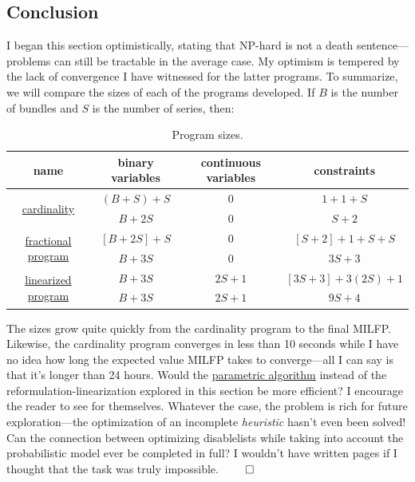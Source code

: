 \documentclass[11pt, oneside]{article}
\theoremstyle{plain}
\theoremstyle{definition}
\begin{document}
\subsection{Conclusion}
I began this section optimistically, stating that NP-hard is not a death
sentence---problems can still be tractable in the average case. My optimism is
tempered by the lack of convergence I have witnessed for the latter programs.
To summarize, we will compare the sizes of each of the programs developed. If
\( B \) is the number of bundles and \( S \) is the number of series, then:
\begin{table}[h!]
  \centering
  \begin{tabular}{|c|c|c|c|}
    \hline
    name & binary variables & continuous variables & constraints \\
    \hline \hline
    \multirow{2}{5em}{\hyperref[eq:char]{cardinality}}
    & \( (B + S) + S \) & 0 & \( 1 + 1 + S \) \\
    & \( B + 2S \) & 0 & \( S + 2 \) \\
    \hline
    \multirow{2}{5em}{\hyperref[eq:expected_value]{fractional program}}
    & \( [B + 2S] + S \) & \( 0 \) & \( [S + 2] + 1 + S + S \) \\
    & \( B + 3S \) & \( 0 \) & \( 3S + 3 \) \\
    \hline
    \multirow{2}{5em}{\hyperref[eq:milfp]{linearized program}}
    & \( B + 3S \) & \( 2S + 1 \) & \( [3S + 3] + 3(2S) + 1 \) \\
    & \( B + 3S \) & \( 2S + 1 \) & \( 9S + 4 \) \\
    \hline
  \end{tabular}
  \caption{Program sizes.}
\end{table}

The sizes grow quite quickly from the cardinality program to the final MILFP.
Likewise, the cardinality program converges in less than 10 seconds while I
have no idea how long the expected value MILFP takes to converge---all I can
say is that it's longer than 24 hours. Would the
\href{https://optimization.mccormick.northwestern.edu/index.php/Mixed-integer_linear_fractional_programming_(MILFP)}
{parametric algorithm} instead of the reformulation-linearization
explored in this section be more efficient? I encourage the reader to
see for themselves. Whatever the case, the problem is rich for future
exploration---the optimization of an incomplete \textit{heuristic} hasn't
even been solved! Can the connection between optimizing disablelists
while taking into account the probabilistic model ever be completed in
full? I wouldn't have written \pageref{here2} pages if I thought that
the task was truly impossible. \( \qed \)
\end{document}
